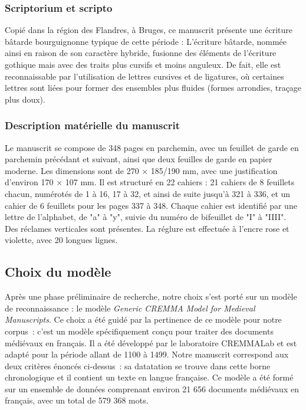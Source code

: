 \documentclass[12pt,a4paper,oneside,titlepage]{article} %
\begin{document}
	\subsubsection{ Scriptorium et scripto}
	Copié dans la région des Flandres, à Bruges, ce manuscrit présente une écriture bâtarde bourguignonne typique de cette période : L'écriture bâtarde, nommée ainsi en raison de son caractère hybride, fusionne des éléments de l'écriture gothique mais avec des traits plus cursifs et moins anguleux. De fait, elle est reconnaissable par l'utilisation de lettres cursives et de ligatures, où certaines lettres sont liées pour former des ensembles plus fluides (formes arrondies, traçage plus doux). 
	
	\subsubsection{Description matérielle du manuscrit}
	
	Le manuscrit se compose de 348 pages en parchemin, avec un feuillet de garde en parchemin précédant et suivant, ainsi que deux feuilles de garde en papier moderne. Les dimensions sont de 270 × 185/190 mm, avec une justification d'environ 170 × 107 mm. Il est structuré en 22 cahiers : 21 cahiers de 8 feuillets chacun, numérotés de 1 à 16, 17 à 32, et ainsi de suite jusqu'à 321 à 336, et un cahier de 6 feuillets pour les pages 337 à 348. Chaque cahier est identifié par une lettre de l'alphabet, de "a" à "y", suivie du numéro de bifeuillet de "I" à "IIII". Des réclames verticales sont présentes. La réglure est effectuée à l'encre rose et violette, avec 20 longues lignes.
	
	\subsection{Choix du modèle}
	
	Après une phase préliminaire de recherche, notre choix s'est porté sur un modèle de reconnaissance : le modèle \emph{Generic CREMMA Model for Medieval Manuscripts}. Ce choix a été guidé par la pertinence de ce modèle pour notre corpus : c’est un modèle spécifiquement conçu pour traiter des documents médiévaux en français. Il a été développé par le laboratoire CREMMALab et est adapté pour la période allant de 1100 à 1499. Notre manuscrit correspond aux deux critères énoncés ci-dessus : sa datatation se trouve dans cette borne chronologique et il contient un texte en langue française. Ce modèle a été formé sur un ensemble de données comprenant environ 21 656 documents médiévaux en français, avec un total de 579 368 mots.
	
\end{document}
